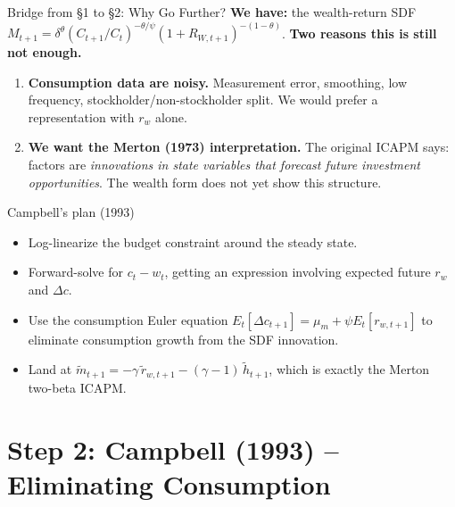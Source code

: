 \documentclass{beamer}
\begin{document}
\begin{frame}[shrink=8]{Bridge from \S 1 to \S 2: Why Go Further?}
	\textbf{We have:} the wealth-return SDF $M_{t+1} = \delta^\theta(C_{t+1}/C_t)^{-\theta/\psi}(1+R_{W,t+1})^{-(1-\theta)}$.
	\vspace{4pt}
	\textbf{Two reasons this is still not enough.}
	\begin{enumerate}
		\item \textbf{Consumption data are noisy.} Measurement error, smoothing, low frequency, stockholder/non-stockholder split. We would prefer a representation with $r_w$ alone.
		\item \textbf{We want the Merton (1973) interpretation.} The original ICAPM says: factors are \textit{innovations in state variables that forecast future investment opportunities}. The wealth form does not yet show this structure.
	\end{enumerate}
	\vspace{4pt}
	\begin{block}{Campbell's plan (1993)}
		\begin{itemize}
			\item Log-linearize the budget constraint around the steady state.
			\item Forward-solve for $c_t-w_t$, getting an expression involving expected future $r_w$ and $\Delta c$.
			\item Use the consumption Euler equation $E_t[\Delta c_{t+1}] = \mu_m + \psi E_t[r_{w,t+1}]$ to eliminate consumption growth from the SDF innovation.
			\item Land at $\widetilde{m}_{t+1} = -\gamma\,\widetilde{r}_{w,t+1} - (\gamma-1)\,\widetilde{h}_{t+1}$, which is exactly the Merton two-beta ICAPM.
		\end{itemize}
	\end{block}
\end{frame}

\section{Step 2: Campbell (1993) -- Eliminating Consumption}
\end{document}
